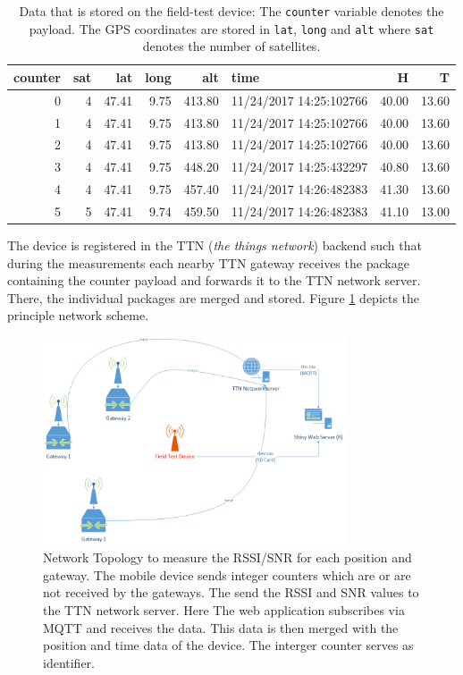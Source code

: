 \begin{table}[h!]
\centering
\begin{tabular}{rrrrrlrr}
  \hline
  counter & sat & lat & long & alt & time & H & T \\ 
  \hline
   0 &   4 & 47.41 & 9.75 & 413.80 & 11/24/2017 14:25:102766  & 40.00 & 13.60 \\ 
     1 &   4 & 47.41 & 9.75 & 413.80 & 11/24/2017 14:25:102766  & 40.00 & 13.60 \\ 
     2 &   4 & 47.41 & 9.75 & 413.80 & 11/24/2017 14:25:102766  & 40.00 & 13.60 \\ 
     3 &   4 & 47.41 & 9.75 & 448.20 & 11/24/2017 14:25:432297 & 40.80 & 13.60 \\ 
     4 &   4 & 47.41 & 9.75 & 457.40 & 11/24/2017 14:26:482383 & 41.30 & 13.60 \\ 
     5 &   5 & 47.41 & 9.74 & 459.50 & 11/24/2017 14:26:482383 & 41.10 & 13.00 \\ 
   \hline
\end{tabular}
\caption{Data that is stored on the field-test device: The \texttt{counter} variable denotes the payload. The GPS coordinates are stored in \texttt{lat}, \texttt{long} and \texttt{alt} where \texttt{sat} denotes the number of satellites.}\label{tab:dev}   
\end{table}

The device is registered in the TTN (\emph{the things network}) backend such that during the measurements each nearby TTN gateway receives the package containing the counter payload and forwards it to the TTN network server. There, the individual packages are merged and stored. Figure \ref{fig:topology} depicts the principle network scheme. 

\begin{figure}[h!]\label{fig:topology}
\centering
\includegraphics[width=0.8\textwidth]{figures/Topologie}
\caption{Network Topology to measure the RSSI/SNR for each position and gateway. The mobile device sends integer counters which are or are not received by the gateways. The send the RSSI and SNR values to the TTN network server. Here The web application subscribes via MQTT and receives the data. This data is then merged with the position and time data of the device. The interger counter serves as identifier.}
\end{figure}

